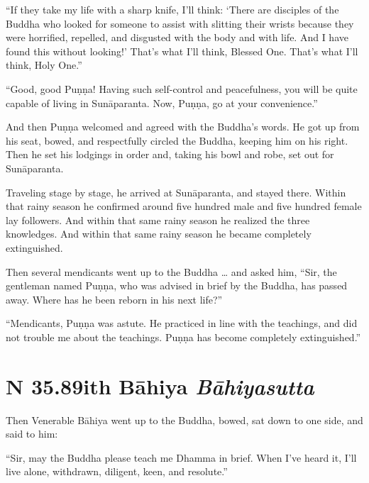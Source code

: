\documentclass[12pt,openany]{book}%
\newcommand*{\suttatitleacronym}[1]{\smaller[2]{#1}\vspace*{.3em}}
\newcommand*{\suttatitletranslation}[1]{\linebreak{#1}}
\newcommand*{\suttatitleroot}[1]{\linebreak\smaller[2]\itshape{#1}}
\newcommand*{\tocacronym}[1]{\hspace*{-3.3em}{#1}\quad}
\newcommand*{\toctranslation}[1]{#1}
\newcommand*{\tocroot}[1]{(\textit{#1})}
\begin{document}
“If they take my life with a sharp knife, I’ll think: ‘There are disciples of the Buddha who looked for someone to assist with slitting their wrists because they were horrified, repelled, and disgusted with the body and with life. And I have found this without looking!’ That’s what I’ll think, Blessed One. That’s what I’ll think, Holy One.” 

“Good, good \textsanskrit{Puṇṇa}! Having such self-control and peacefulness, you will be quite capable of living in \textsanskrit{Sunāparanta}. Now, \textsanskrit{Puṇṇa}, go at your convenience.” 

And then \textsanskrit{Puṇṇa} welcomed and agreed with the Buddha’s words. He got up from his seat, bowed, and respectfully circled the Buddha, keeping him on his right. Then he set his lodgings in order and, taking his bowl and robe, set out for \textsanskrit{Sunāparanta}. 

Traveling stage by stage, he arrived at \textsanskrit{Sunāparanta}, and stayed there. Within that rainy season he confirmed around five hundred male and five hundred female lay followers. And within that same rainy season he realized the three knowledges. And within that same rainy season he became completely extinguished. 

Then several mendicants went up to the Buddha … and asked him, “Sir, the gentleman named \textsanskrit{Puṇṇa}, who was advised in brief by the Buddha, has passed away. Where has he been reborn in his next life?” 

“Mendicants, \textsanskrit{Puṇṇa} was astute. He practiced in line with the teachings, and did not trouble me about the teachings. \textsanskrit{Puṇṇa} has become completely extinguished.” 

%
\section*{{\suttatitleacronym SN 35.89}{\suttatitletranslation With Bāhiya }{\suttatitleroot Bāhiyasutta}}
\addcontentsline{toc}{section}{\tocacronym{SN 35.89} \toctranslation{With Bāhiya } \tocroot{Bāhiyasutta}}

Then Venerable \textsanskrit{Bāhiya} went up to the Buddha, bowed, sat down to one side, and said to him: 

“Sir, may the Buddha please teach me Dhamma in brief. When I’ve heard it, I’ll live alone, withdrawn, diligent, keen, and resolute.” 
\end{document}

